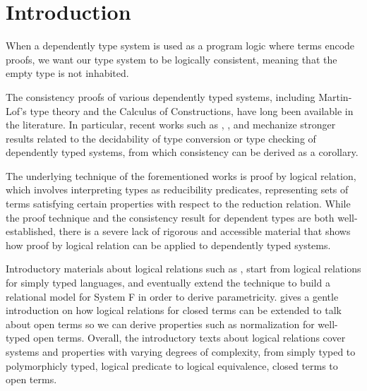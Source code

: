 \documentclass[acmsmall]{acmart}
\begin{document}
\maketitle

\section{Introduction}
When a dependently type system is used as a program logic where terms
encode proofs, we want our type system to be logically consistent,
meaning that the empty type is not inhabited.

The consistency proofs of various dependently typed systems, including Martin-Lof's
type theory and the Calculus of Constructions, have long been
available in the literature. In particular, recent works such as \citet{nbeincoq},
\citet{decagda}, and \citet{martin-lof-a-la-coq} mechanize stronger
results related to the decidability of type conversion or type
checking of dependently typed systems, from which consistency can be
derived as a corollary.

The underlying technique of the forementioned
works is proof by logical relation,
which involves interpreting types as reducibility predicates,
representing sets of terms satisfying certain properties with respect
to the reduction relation. While the proof technique and the
consistency result for dependent types are both well-established,
there is a severe lack of rigorous and accessible material that shows
how proof by logical relation can be applied to dependently typed
systems.

Introductory materials about logical relations such as
\citet{skorstengaard2019introduction}, \citet{harper2016practical}
start from logical relations for simply typed languages, and
eventually extend the technique to build a relational model for System
F in order to derive
parametricity. \citet{harperkripke} gives a gentle introduction on how
logical relations for closed terms can be extended to talk about open
terms so we can derive properties such as normalization for well-typed
open terms. Overall, the introductory texts about logical relations
cover systems and properties with varying degrees of complexity, from
simply typed to polymorphicly typed, logical predicate to logical
equivalence, closed terms to open terms.
\end{document}
